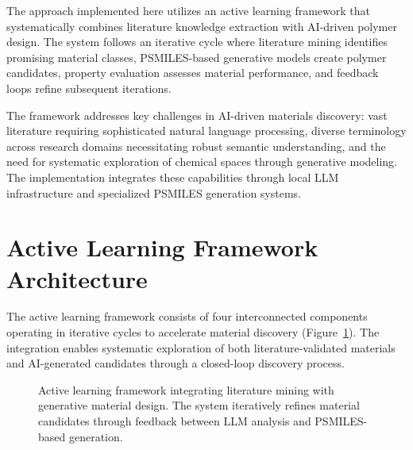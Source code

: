 \documentclass[%
 reprint,
 amsmath,amssymb,
 aps,
]{revtex4-2}
\begin{document}
The approach implemented here utilizes an active learning framework that systematically combines literature knowledge extraction with AI-driven polymer design. The system follows an iterative cycle where literature mining identifies promising material classes, PSMILES-based generative models create polymer candidates, property evaluation assesses material performance, and feedback loops refine subsequent iterations.

The framework addresses key challenges in AI-driven materials discovery: vast literature requiring sophisticated natural language processing, diverse terminology across research domains necessitating robust semantic understanding, and the need for systematic exploration of chemical spaces through generative modeling. The implementation integrates these capabilities through local LLM infrastructure and specialized PSMILES generation systems.

\section{Active Learning Framework Architecture}

The active learning framework consists of four interconnected components operating in iterative cycles to accelerate material discovery (Figure~\ref{fig:framework}). The integration enables systematic exploration of both literature-validated materials and AI-generated candidates through a closed-loop discovery process.

\begin{figure}[t]
\centering
{}
\caption{Active learning framework integrating literature mining with generative material design. The system iteratively refines material candidates through feedback between LLM analysis and PSMILES-based generation.}
\label{fig:framework}
\end{figure}
\end{document}
